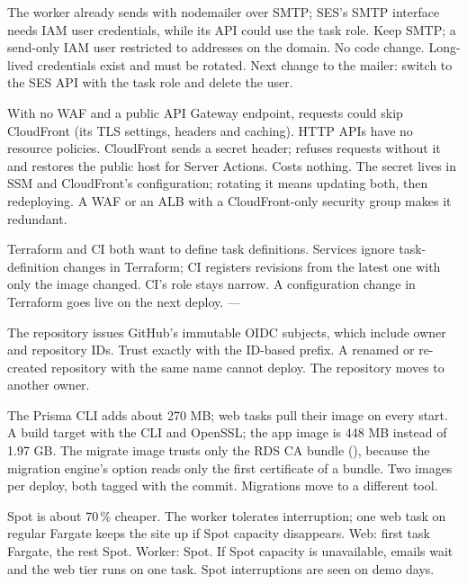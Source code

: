   {The worker already sends with nodemailer over SMTP; SES's SMTP interface needs IAM user
   credentials, while its API could use the task role.}
  {Keep SMTP; a send-only IAM user restricted to  addresses on the domain.}
  {No code change. Long-lived credentials exist and must be rotated.}
  {Next change to the mailer: switch to the SES API with the task role and delete the user.}

  {With no WAF and a public API Gateway endpoint, requests could skip CloudFront (its TLS
   settings, headers and caching). HTTP APIs have no resource policies.}
  {CloudFront sends a secret header;  refuses requests without it and restores
   the public host for Server Actions.}
  {Costs nothing. The secret lives in SSM and CloudFront's configuration; rotating it means
   updating both, then redeploying.}
  {A WAF or an ALB with a CloudFront-only security group makes it redundant.}

  {Terraform and CI both want to define task definitions.}
  {Services ignore task-definition changes in Terraform; CI registers revisions from the latest one
   with only the image changed.}
  {CI's role stays narrow. A configuration change in Terraform goes live on the next deploy.}
  {—}

  {The repository issues GitHub's immutable OIDC subjects, which include owner and repository IDs.}
  {Trust exactly  with the ID-based prefix.}
  {A renamed or re-created repository with the same name cannot deploy.}
  {The repository moves to another owner.}

  {The Prisma CLI adds about 270 MB; web tasks pull their image on every start.}
  {A  build target with the CLI and OpenSSL; the app image is 448 MB instead of
   1.97 GB. The migrate image trusts only the RDS CA bundle (), because the
   migration engine's  option reads only the first certificate of a bundle.}
  {Two images per deploy, both tagged with the commit.}
  {Migrations move to a different tool.}

  {Spot is about 70\,\% cheaper. The worker tolerates interruption; one web task on regular
   Fargate keeps the site up if Spot capacity disappears.}
  {Web: first task Fargate, the rest Spot. Worker: Spot.}
  {If Spot capacity is unavailable, emails wait and the web tier runs on one task.}
  {Spot interruptions are seen on demo days.}

